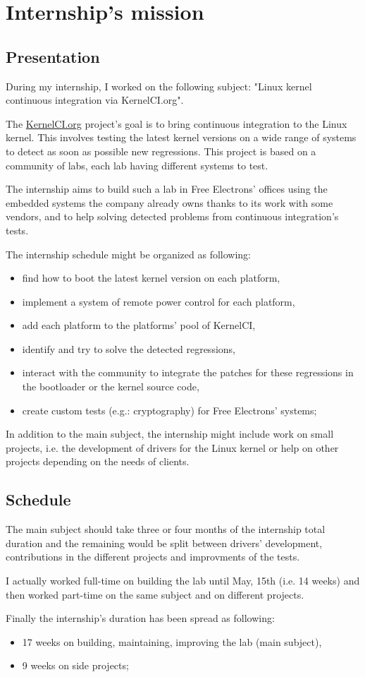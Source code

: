 \chapter{Internship's mission}

\section{Presentation}
During my internship, I worked on the following subject: "Linux kernel continuous integration via KernelCI.org".

The \href{https://kernelci.org}{KernelCI.org} project's goal is to bring continuous integration to the Linux kernel. This involves testing the latest kernel versions on a wide range of systems to detect as soon as possible new regressions. This project is based on a community of labs, each lab having different systems to test.

The internship aims to build such a lab in Free Electrons' offices using the embedded systems the company already owns thanks to its work with some vendors, and to help solving detected problems from continuous integration's tests.

The internship schedule might be organized as following:
\begin{itemize}
  \item find how to boot the latest kernel version on each platform,
  \item implement a system of remote power control for each platform,
  \item add each platform to the platforms' pool of KernelCI,
  \item identify and try to solve the detected regressions,
  \item interact with the community to integrate the patches for these regressions in the bootloader or the kernel source code,
  \item create custom tests (e.g.: cryptography) for Free Electrons' systems;
\end{itemize}

In addition to the main subject, the internship might include work on small projects, i.e. the development of drivers for the Linux kernel or help on other projects depending on the needs of clients.

\section{Schedule}
The main subject should take three or four months of the internship total duration and the remaining would be split between drivers' development, contributions in the different projects and improvments of the tests.

I actually worked full-time on building the lab until May, 15th (i.e. 14 weeks) and then worked part-time on the same subject and on different projects.

Finally the internship's duration has been spread as following:
\begin{itemize}
  \item 17 weeks on building, maintaining, improving the lab (main subject),
  \item 9 weeks on side projects;
\end{itemize}
